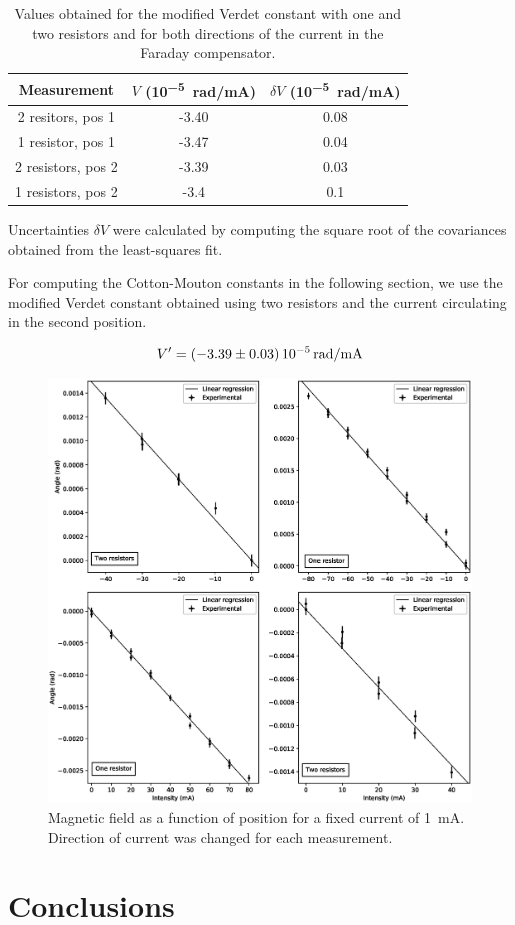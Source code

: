 \documentclass[11pt,a4paper]{article}
\begin{document}
\begin{table}[H]
\centering
\begin{tabular}{ccc}
\toprule
Measurement & $V$ (\si{10^{-5}.\radian/\mA}) & $\delta V$ (\si{10^{-5}.\radian/\mA})\\
\midrule
2 resitors, pos 1 & -3.40 & 0.08 \\
1 resistor, pos 1 & -3.47 & 0.04 \\
2 resistors, pos 2 & -3.39 & 0.03 \\
1 resistors, pos 2 & -3.4 & 0.1 \\
\bottomrule
\end{tabular}
\caption{Values obtained for the modified Verdet constant with one and two resistors and for both directions of the current in the Faraday compensator.}
\label{table:verdet}
\end{table}

Uncertainties $\delta V$ were calculated by computing the square root of the covariances obtained from the least-squares fit.

For computing the Cotton-Mouton constants in the following section, we use the modified Verdet constant obtained using two resistors and the current circulating in the second position.

\begin{equation}
V'=\SI{-3.39\pm0.03}{\num{e-5}.\radian/\mA}
\end{equation}

\begin{figure}[H]
\centering
\includegraphics[width=\textwidth]{Angle_diff_intensity2.eps}
\caption{Magnetic field as a function of position for a fixed current of \SI{1}{\mA}. Direction of current was changed for each measurement.}
\label{fig:FaradayAngle}
\end{figure}



\section{Conclusions}

\newpage


\end{document}
